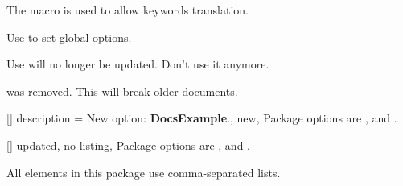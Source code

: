 \documentclass[11pt, outdir = ./out]{article}
\begin{document}
\begin{DocsExample}
    The  macro is used to allow keywords translation.
\end{DocsExample}

\begin{DocsExample}
    Use  to set global options.
\end{DocsExample}

\begin{DocsExample}
    Use  will no longer be updated. Don't use it anymore.
\end{DocsExample}

\begin{DocsExample}
     was removed. This will break older documents.
\end{DocsExample}

\begin{DocsExample}
    []{
        description = {New option:  \textbf{DocsExample}.},
        new,  %
    }%
    Package options are ,  and .
\end{DocsExample}

\begin{DocsExample}
    []{
        updated,
        no listing,  %
    }%
    Package options are ,  and .

    All elements in this package use comma-separated lists.
\end{DocsExample}

\printindex
\end{document}
